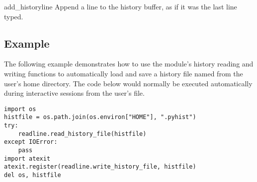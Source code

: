 \begin{funcdesc}{add_history}{line}
Append a line to the history buffer, as if it was the last line typed.
\end{funcdesc}


\begin{seealso}
\end{seealso}


\subsection{Example \label{readline-example}}

The following example demonstrates how to use the
 module's history reading and writing functions to
automatically load and save a history file named  from
the user's home directory.  The code below would normally be executed
automatically during interactive sessions from the user's
 file.

\begin{verbatim}
import os
histfile = os.path.join(os.environ["HOME"], ".pyhist")
try:
    readline.read_history_file(histfile)
except IOError:
    pass
import atexit
atexit.register(readline.write_history_file, histfile)
del os, histfile
\end{verbatim}
